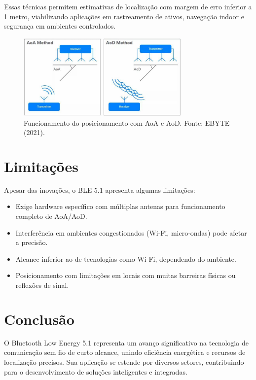 \documentclass[12pt,a4paper]{report}
\begin{document}
Essas técnicas permitem estimativas de localização com margem de erro inferior a 1 metro, viabilizando aplicações em rastreamento de ativos, navegação indoor e segurança em ambientes controlados.

\begin{figure}[h!]
    \centering
    \includegraphics[width=0.75\textwidth]{figura.png}
    \caption{Funcionamento do posicionamento com AoA e AoD. Fonte: EBYTE (2021).}
    \label{fig:aoa_aod}
\end{figure}

\chapter{Limitações}
Apesar das inovações, o BLE 5.1 apresenta algumas limitações:
\begin{itemize}
    \item Exige hardware específico com múltiplas antenas para funcionamento completo de AoA/AoD.
    \item Interferência em ambientes congestionados (Wi-Fi, micro-ondas) pode afetar a precisão.
    \item Alcance inferior ao de tecnologias como Wi-Fi, dependendo do ambiente.
    \item Posicionamento com limitações em locais com muitas barreiras físicas ou reflexões de sinal.
\end{itemize}

\chapter{Conclusão}
O Bluetooth Low Energy 5.1 representa um avanço significativo na tecnologia de comunicação sem fio de curto alcance, unindo eficiência energética e recursos de localização precisos. Sua aplicação se estende por diversos setores, contribuindo para o desenvolvimento de soluções inteligentes e integradas.
\end{document}
